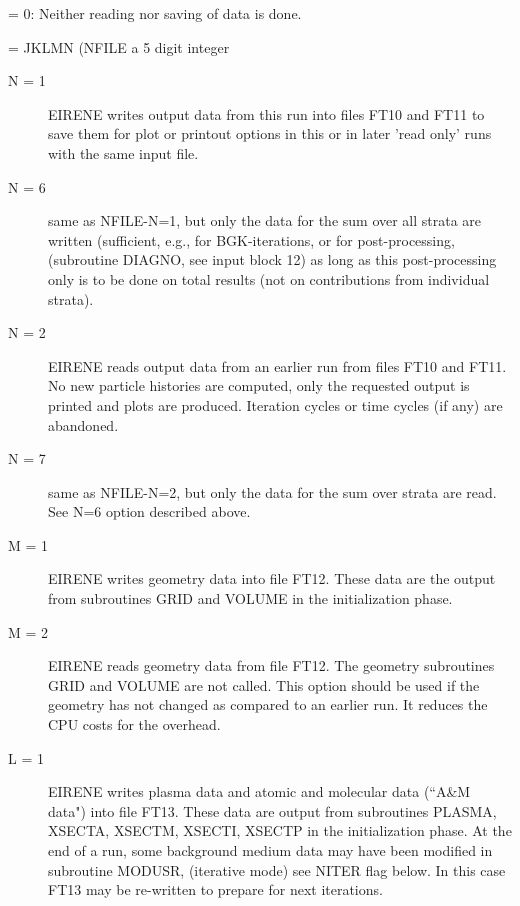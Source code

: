 \begin{description}
        = 0: Neither reading nor saving of data is done.

        = JKLMN   (NFILE a 5 digit integer
        \begin{description}
          \item [N = 1 ] EIRENE writes output data from this run into files FT10 and FT11
                to save them for plot or printout options in this or in later 'read only' runs
                with the same input file.
          \item [N = 6 ] same as NFILE-N=1, but only the data for the sum over all strata
                are written (sufficient, e.g., for \acs{BGK}-iterations, or for
                post-processing, (subroutine DIAGNO, see input block 12) as long as this
                post-processing only is to be done on total results (not on contributions from
                individual strata).
          \item [N = 2 ] EIRENE reads output data from an earlier run from files FT10 and
                FT11.
                No new particle histories are computed, only the requested output is printed
                and plots are produced.
                Iteration cycles or time cycles (if any) are abandoned.
          \item [N = 7 ] same as NFILE-N=2, but only the data for the sum over strata are
                read.
                See N=6 option described above.
          \item [M = 1 ] EIRENE writes geometry data into file FT12.
                These data are the output from subroutines GRID and VOLUME in the
                initialization phase.
          \item [M = 2 ] EIRENE reads geometry data from file FT12.
                The geometry subroutines GRID and VOLUME are not called.
                This option should be used if the geometry has not changed as compared to an
                earlier run.
                It reduces the CPU costs for the overhead.
          \item [L = 1 ] EIRENE writes plasma data and atomic and molecular data (``A\&M
                data") into file FT13.
                These data are output from subroutines PLASMA, XSECTA, XSECTM, XSECTI, XSECTP
                in the initialization phase.
                At the end of a run, some background medium data may have been modified in
                subroutine MODUSR, (iterative mode) see NITER flag below.
                In this case FT13 may be re-written to prepare for next iterations.


\end{description}
\end{description}
